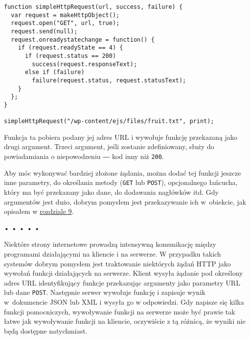   
\begin{verbatim} 
function simpleHttpRequest(url, success, failure) {
  var request = makeHttpObject();
  request.open("GET", url, true);
  request.send(null);
  request.onreadystatechange = function() {
    if (request.readyState == 4) {
      if (request.status == 200)
        success(request.responseText);
      else if (failure)
        failure(request.status, request.statusText);
    }
  };
}

simpleHttpRequest("/wp-content/ejs/files/fruit.txt", print);
 \end{verbatim}
  
Funkcja ta pobiera podany jej adres URL i wywołuje funkcję przekazaną jako drugi argument. Trzeci argument, jeśli zostanie zdefiniowany, służy do powiadamiania o niepowodzeniu ― kod inny niż \texttt{200}.

  
Aby móc wykonywać bardziej złożone żądania, można dodać tej funkcji jeszcze inne parametry, do określania metody (\texttt{GET} lub \texttt{POST}), opcjonalnego łańcucha, który ma być przekazany jako dane, do dodawania nagłówków itd. Gdy argumentów jest dużo, dobrym pomysłem jest przekazywanie ich w~obiekcie, jak opisałem w \hyperref[chap:9]{rozdziale 9}.



\begin{center}
• • • • •
\end{center}

  
Niektóre strony internetowe prowadzą intensywną komunikację między programami działającymi na kliencie i na serwerze. W przypadku takich systemów dobrym pomysłem jest traktowanie niektórych żądań HTTP jako wywołań funkcji działających na serwerze. Klient wysyła żądanie pod określony adres URL identyfikujący funkcje przekazując argumenty jako parametry URL lub dane \texttt{POST}. Następnie serwer wywołuje funkcję i zapisuje wynik w~dokumencie JSON lub XML i wysyła go w odpowiedzi. Gdy napisze się kilka funkcji pomocniczych, wywoływanie funkcji na serwerze może być prawie tak łatwe jak wywoływanie funkcji na kliencie, oczywiście z tą różnicą, że wyniki nie będą dostępne natychmiast.